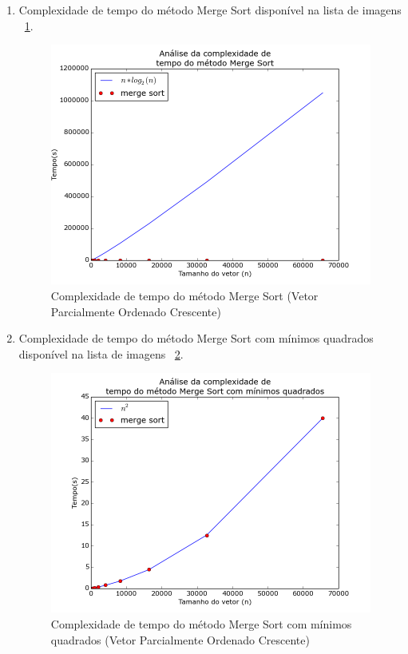 \documentclass[12pt,a4paper,twoside]{report}
\begin{document}
\begin{enumerate}
\begin{enumerate}
								\item Complexidade de tempo do método Merge Sort disponível na lista de imagens ~\ref{fig:MergePlot2POC}.
								\begin{figure}[!h]
									\centering
									\includegraphics[scale=0.6]{../imagens/Merge/merge_plot_2_parcialmente_ordenado_crescente.png}
									\caption{Complexidade de tempo do método Merge Sort (Vetor Parcialmente Ordenado Crescente) \label{fig:MergePlot2POC}}
								\end{figure}


								\item Complexidade de tempo do método Merge Sort com mínimos quadrados disponível na lista de imagens  ~\ref{fig:MergePlot3POC}.
								\begin{figure}[!h]
									\centering
									\includegraphics[scale=0.6]{../imagens/Merge/merge_plot_3_parcialmente_ordenado_crescente.png}
									\caption{Complexidade de tempo do método Merge Sort com mínimos quadrados (Vetor Parcialmente Ordenado Crescente) \label{fig:MergePlot3POC}}
								\end{figure}


\end{enumerate}
\end{enumerate}
\end{document}
